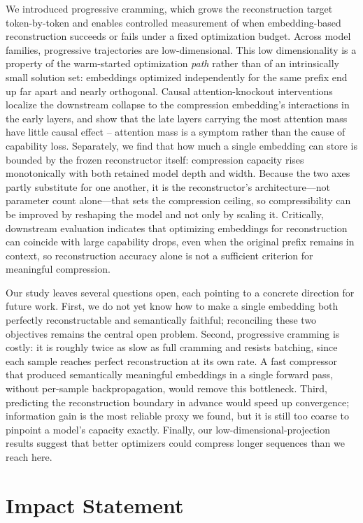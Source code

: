 \documentclass{article}
\theoremstyle{plain}
\theoremstyle{definition}
\theoremstyle{remark}
\begin{document}
We introduced progressive cramming, which grows the reconstruction target token-by-token and enables controlled measurement of when embedding-based reconstruction succeeds or fails under a fixed optimization budget.
Across model families, progressive trajectories are low-dimensional.
This low dimensionality is a property of the warm-started optimization \emph{path} rather than of an intrinsically small solution set: embeddings optimized independently for the same prefix end up far apart and nearly orthogonal.
Causal attention-knockout interventions localize the downstream collapse to the compression embedding's interactions in the early layers, and show that the late layers carrying the most attention mass have little causal effect -- attention mass is a symptom rather than the cause of capability loss.
Separately, we find that how much a single embedding can store is bounded by the frozen reconstructor itself: compression capacity rises monotonically with both retained model depth and width.
Because the two axes partly substitute for one another, it is the reconstructor's architecture---not parameter count alone---that sets the compression ceiling, so compressibility can be improved by reshaping the model and not only by scaling it.
Critically, downstream evaluation indicates that optimizing embeddings for reconstruction can coincide with large capability drops, even when the original prefix remains in context, so reconstruction accuracy alone is not a sufficient criterion for meaningful compression.

Our study leaves several questions open, each pointing to a concrete direction for future work.
First, we do not yet know how to make a single embedding both perfectly reconstructable and semantically faithful; reconciling these two objectives remains the central open problem.
Second, progressive cramming is costly: it is roughly twice as slow as full cramming and resists batching, since each sample reaches perfect reconstruction at its own rate.
A fast compressor that produced semantically meaningful embeddings in a single forward pass, without per-sample backpropagation, would remove this bottleneck.
Third, predicting the reconstruction boundary in advance would speed up convergence; information gain is the most reliable proxy we found, but it is still too coarse to pinpoint a model's capacity exactly.
Finally, our low-dimensional-projection results suggest that better optimizers could compress longer sequences than we reach here.

\section*{Impact Statement}
\end{document}

